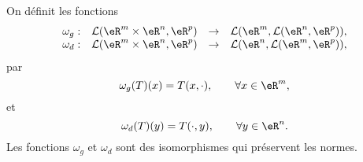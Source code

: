 \begin{proposition}\label{isom_isom}
  On définit les fonctions
  \begin{equation}
    \begin{array}{rccc}
      \omega_g: & \mathcal{L}(\eR^{m}\times\eR^{n}, \eR^p)&\to &\mathcal{L}(\eR^{m}, \mathcal{L}(\eR^{n}, \eR^p)),\\
      \omega_d: & \mathcal{L}(\eR^{m}\times\eR^{n}, \eR^p)&\to &\mathcal{L}(\eR^{n}, \mathcal{L}(\eR^{m}, \eR^p)),
    \end{array}
  \end{equation}
par 
\[
\omega_g(T)(x)=T(x,\cdot), \qquad \forall x\in\eR^m,
\]
et
\[
\omega_d(T)(y)=T(\cdot, y), \qquad \forall y\in\eR^n.
\]
Les fonctions $\omega_g$ et $\omega_d$ sont des isomorphismes qui préservent les normes.    
\end{proposition}
